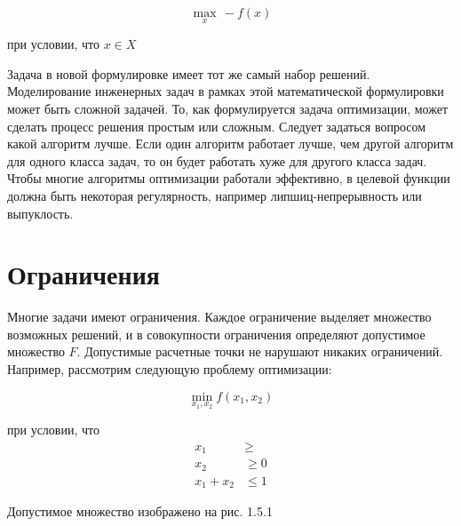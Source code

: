 \begin{equation}
  \max_{x} \, -f(x) 
\end{equation}

 \begin{center}
 при условии, что $x \in X$
 \end{center}
 
Задача в новой формулировке имеет тот же самый набор решений. Моделирование инженерных задач в рамках этой математической формулировки может быть сложной задачей. То, как формулируется задача оптимизации, может сделать процесс решения простым или сложным. Следует задаться вопросом какой алгоритм лучше. Если один алгоритм работает лучше, чем другой алгоритм для одного класса задач, то он будет работать хуже для другого класса задач. Чтобы многие алгоритмы оптимизации работали эффективно, в целевой функции должна быть некоторая регулярность, например липшиц-непрерывность или выпуклость. 

\section{Ограничения}

Многие задачи имеют ограничения. Каждое ограничение выделяет множество возможных решений, и в совокупности ограничения определяют допустимое множество  $F$. Допустимые расчетные точки не нарушают никаких ограничений. Например, рассмотрим следующую проблему оптимизации:

\begin{equation}
\min_{x_1, x_2} f(x_1, x_2) 
\end{equation}


 \begin{center}
 при условии, что 
\begin{equation}
  \begin{aligned}
    x_1 &\geq  \\
    x_2 &\geq 0  \\
    x_1 + x_2 &\leq 1
  \end{aligned}
\end{equation}
\end{center}

Допустимое множество изображено на рис. 1.5.1

